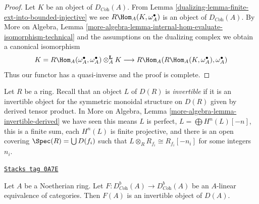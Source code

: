 \begin{proof}

Let $K$ be an object of $D_{\textit{Coh}}(A)$. From
Lemma \ref{dualizing-lemma-finite-ext-into-bounded-injective}
we see $R\Hom_A(K, \omega_A^\bullet)$ is an object of $D_{\textit{Coh}}(A)$.
By More on Algebra, Lemma
\ref{more-algebra-lemma-internal-hom-evaluate-isomorphism-technical}
and the assumptions on the dualizing complex
we obtain a canonical isomorphism
$$
K = R\Hom_A(\omega_A^\bullet, \omega_A^\bullet) \otimes_A^\mathbf{L} K
\longrightarrow
R\Hom_A(R\Hom_A(K, \omega_A^\bullet), \omega_A^\bullet)
$$
Thus our functor has a quasi-inverse and the proof is complete.
\end{proof}

Let $R$ be a ring. Recall that an object $L$ of $D(R)$ is
{\it invertible} if it is an invertible object for the
symmetric monoidal structure on $D(R)$ given by derived
tensor product. In
More on Algebra, Lemma \ref{more-algebra-lemma-invertible-derived}
we have seen this means $L$ is perfect, $L = \bigoplus H^n(L)[-n]$,
this is a finite sum, each $H^n(L)$ is finite projective,
and there is an open covering $\Spec(R) = \bigcup D(f_i)$ such that
$L \otimes_R R_{f_i} \cong R_{f_i}[-n_i]$ for some integers $n_i$.

\begin{lemma}
\label{dualizing-lemma-equivalence-comes-from-invertible}
\href{https://stacks.math.columbia.edu/tag/0A7E}{\texttt{Stacks tag 0A7E}}

Let $A$ be a Noetherian ring. Let
$F : D^b_{\textit{Coh}}(A) \to D^b_{\textit{Coh}}(A)$ be an $A$-linear
equivalence of categories. Then $F(A)$ is an invertible object of $D(A)$.
\end{lemma}

